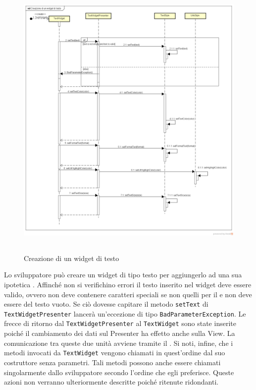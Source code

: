 \label{Creazione di un widget di testo}
\begin{figure}[ht]
	\centering
	\includegraphics[width=16cm, height=14cm]{Sezioni/Diagrammi/img/Creazione di un widget di testo.png}
	\caption{Creazione di un widget di testo}
\end{figure}

Lo sviluppatore può creare un widget di tipo testo per aggiungerlo ad una sua ipotetica . Affinché non si verifichino errori il testo inserito nel widget deve essere valido, ovvero non deve contenere caratteri speciali se non quelli per il  e non deve essere del testo vuoto. Se ciò dovesse capitare il metodo \texttt{setText} di \texttt{TextWidgetPresenter} lancerà un'eccezione di tipo \texttt{BadParameterException}.
Le frecce di ritorno dal \texttt{TextWidgetPresenter}  al \texttt{TextWidget} sono state inserite poiché il cambiamento dei dati sul Presenter ha effetto anche sulla View. La comunicazione tra queste due unità avviene tramite il  .
Si noti, infine, che i metodi invocati da \texttt{TextWidget} vengono chiamati in quest'ordine dal suo costruttore senza parametri. Tali metodi possono anche essere chiamati singolarmente dallo sviluppatore secondo l'ordine che egli preferisce. Queste azioni non verranno ulteriormente descritte poiché ritenute ridondanti.

